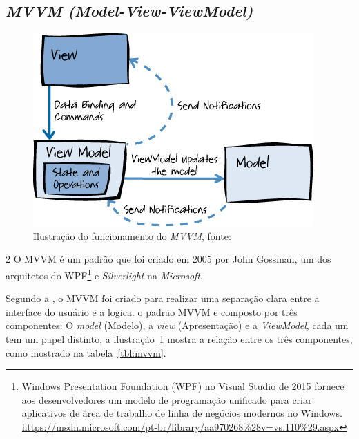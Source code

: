 \subsection{\textit{MVVM (Model-View-ViewModel)}}

    \begin{figure}[h]
        \centering
        \includegraphics[keepaspectratio=true,scale=0.8]{figuras/mvvm-microsoft.png}
        \caption{Ilustração do funcionamento do \textit{MVVM}, fonte: \cite{ms_mvvm}}
        \label{fig:mvvm-microsoft}
    \end{figure}
2
O \ac{MVVM} é um padrão que foi criado em 2005 por John Gossman, um dos arquitetos do \ac{WPF}\footnote{Windows Presentation Foundation (WPF) no Visual Studio de 2015 fornece aos desenvolvedores um modelo de programação unificado para criar aplicativos de área de trabalho de linha de negócios modernos no Windows. \url{https://msdn.microsoft.com/pt-br/library/aa970268\%28v=vs.110\%29.aspx}} e \textit{Silverlight} na \textit{Microsoft}.

Segundo a , o \acf{MVVM} foi criado para realizar uma separação clara entre a interface do usuário e a logica. o padrão \ac{MVVM} e composto por três componentes: O \textit{model} (Modelo), a \textit{view} (Apresentação) e a \textit{ViewModel}, cada um tem um papel distinto, a ilustração~\ref{fig:mvvm-microsoft} mostra a relação entre os três componentes, como mostrado na tabela~\ref{tbl:mvvm}.

